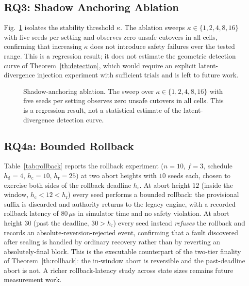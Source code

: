 \documentclass[journal]{IEEEtran}
\begin{document}
\subsection{RQ3: Shadow Anchoring Ablation}
Fig.~\ref{fig:ablation} isolates the stability threshold $\kappa$. The ablation sweeps
$\kappa\in\{1,2,4,8,16\}$ with five seeds per setting and observes zero unsafe cutovers in all
cells, confirming that increasing $\kappa$ does not introduce safety failures over the tested
range. This is a regression result; it does not estimate the geometric detection curve of
Theorem~\ref{th:detection}, which would require an explicit latent-divergence injection
experiment with sufficient trials and is left to future work.

\begin{figure}[t]
\centering
{}
\caption{Shadow-anchoring ablation. The sweep over
$\kappa\in\{1,2,4,8,16\}$ with five seeds per setting observes zero unsafe cutovers in all
cells. This is a regression result, not a statistical estimate of the
latent-divergence detection curve.}
\label{fig:ablation}
\end{figure}

\subsection{RQ4a: Bounded Rollback}
Table~\ref{tab:rollback} reports the rollback experiment ($n{=}10$, $f{=}3$,
schedule $h_{\mathrm{d}}{=}4$, $h_{\mathrm{c}}{=}10$, $h_{\mathrm{r}}{=}25$) at two abort heights
with $10$ seeds each, chosen to exercise both sides of the rollback deadline $h_{\mathrm{r}}$. At
abort height $12$ (inside the window, $h_{\mathrm{c}}{<}12{<}h_{\mathrm{r}}$) every seed performs
a bounded rollback: the provisional suffix is discarded and authority returns to the legacy
engine, with a recorded rollback latency of $80\,\mu$s in simulator time and no safety violation.
At abort height $30$ (past the deadline, $30{>}h_{\mathrm{r}}$) every seed instead \emph{refuses}
the rollback and records an absolute-reversion-rejected event, confirming that a fault discovered
after sealing is handled by ordinary recovery rather than by reverting an absolutely-final block.
This is the executable counterpart of the two-tier finality of Theorem~\ref{th:rollback}: the
in-window abort is reversible and the past-deadline abort is not. A richer rollback-latency study
across state sizes remains future measurement work.
\end{document}

